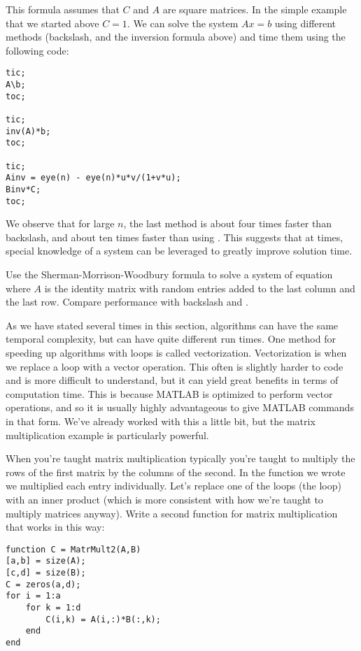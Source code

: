 This formula assumes that $C$ and $A$ are square matrices. In the simple example that we started above $C = 1$. We can solve the system $Ax = b$ using different methods (backslash,  and the inversion formula above) and time them using the following code:
\begin{lstlisting}[style=matlab]
tic;
A\b;
toc;

tic;
inv(A)*b;
toc;

tic;
Ainv = eye(n) - eye(n)*u*v/(1+v*u);
Binv*C;
toc;
\end{lstlisting}

We observe that for large $n$, the last method is about four times faster than backslash, and about ten times faster than using . This suggests that at times, special knowledge of a system can be leveraged to greatly improve solution time.

\begin{problem}
Use the Sherman-Morrison-Woodbury formula to solve a system of equation where $A$ is the identity matrix with random entries added to the last column and the last row. Compare performance with backslash and .
\end{problem}


As we have stated several times in this section, algorithms can have the same temporal complexity, but can have quite different run times. One method for speeding up algorithms with loops is called vectorization. Vectorization is when we replace a loop with a vector operation. This often is slightly harder to code and is more difficult to understand, but it can yield great benefits in terms of computation time. This is because MATLAB is optimized to perform vector operations, and so it is usually highly advantageous to give MATLAB commands in that form. We've already worked with this a little bit, but the matrix multiplication example is particularly powerful.

When you're taught matrix multiplication typically you're taught to multiply the rows of the first matrix by the columns of the second. In the function we wrote we multiplied each entry individually. Let's replace one of the loops (the  loop) with an inner product (which is more consistent with how we're taught to multiply matrices anyway). Write a second function for matrix multiplication that works in this way:
\begin{lstlisting}[style=matlab]
function C = MatrMult2(A,B)
[a,b] = size(A);
[c,d] = size(B);
C = zeros(a,d);
for i = 1:a
    for k = 1:d
        C(i,k) = A(i,:)*B(:,k);
    end
end
\end{lstlisting}

